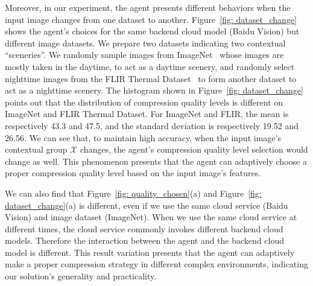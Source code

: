 
Moreover, in our experiment, the agent presents different behaviors when the input image changes from one dataset to another. Figure~\ref{fig: dataset_change} shows the agent's choices for the same backend cloud model (Baidu Vision) but different image datasets. We prepare two datasets indicating two contextual ``sceneries''. We randomly sample images from ImageNet~\cite{ImageNet} whose images are mostly taken in the daytime, to act as a daytime scenery, and randomly select nighttime images from the FLIR Thermal Dataset~\cite{FLIR} to form another dataset to act as a nighttime scenery. \textcolor{revise}{The histogram shown in Figure~\ref{fig: dataset_change} points out that the distribution of compression quality levels is different on ImageNet and FLIR Thermal Dataset. For ImageNet and FLIR, the mean is respectively 43.3 and 47.5, and the standard deviation is respectively 19.52 and 26.56.} We can see that, to maintain high accuracy, when the input image's contextual group $ \mathcal{X} $ changes, the agent's compression quality level selection would change as well. This phenomenon presents that the agent can adaptively choose a proper compression quality level based on the input image's features. 

\textcolor{revise}{We can also find that Figure~\ref{fig: quality_chosen}(a) and Figure~\ref{fig: dataset_change}(a) is different, even if we use the same cloud service (Baidu Vision) and image dataset (ImageNet). When we use the same cloud service at different times, the cloud service commonly invokes different backend cloud models. Therefore the interaction between the agent and the backend cloud model is different. This result variation presents that the agent can adaptively make a proper compression strategy in different complex environments, indicating our solution's generality and practicality.} %


